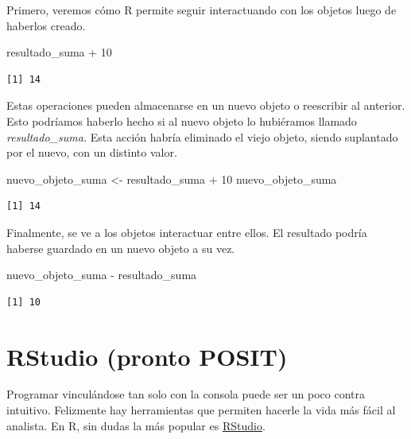 \documentclass[
  letterpaper,
  DIV=11,
  numbers=noendperiod]{scrreprt}
\newenvironment{Shaded}{\begin{snugshade}}{\end{snugshade}}
\newcommand{\DecValTok}[1]{\textcolor[rgb]{0.68,0.00,0.00}{#1}}
\newcommand{\NormalTok}[1]{\textcolor[rgb]{0.00,0.23,0.31}{#1}}
\newcommand{\OtherTok}[1]{\textcolor[rgb]{0.00,0.23,0.31}{#1}}
\newcommand{\SpecialCharTok}[1]{\textcolor[rgb]{0.37,0.37,0.37}{#1}}
\begin{document}
Primero, veremos cómo R permite seguir interactuando con los objetos
luego de haberlos creado.

\begin{Shaded}
\begin{Highlighting}[]
\NormalTok{resultado\_suma }\SpecialCharTok{+} \DecValTok{10}
\end{Highlighting}
\end{Shaded}

\begin{verbatim}
[1] 14
\end{verbatim}

Estas operaciones pueden almacenarse en un nuevo objeto o reescribir al
anterior. Esto podríamos haberlo hecho si al nuevo objeto lo hubiéramos
llamado \emph{resultado\_suma.} Esta acción habría eliminado el viejo
objeto, siendo suplantado por el nuevo, con un distinto valor.

\begin{Shaded}
\begin{Highlighting}[]
\NormalTok{nuevo\_objeto\_suma }\OtherTok{\textless{}{-}}\NormalTok{ resultado\_suma }\SpecialCharTok{+} \DecValTok{10}
\NormalTok{nuevo\_objeto\_suma}
\end{Highlighting}
\end{Shaded}

\begin{verbatim}
[1] 14
\end{verbatim}

Finalmente, se ve a los objetos interactuar entre ellos. El resultado
podría haberse guardado en un nuevo objeto a su vez.

\begin{Shaded}
\begin{Highlighting}[]
\NormalTok{nuevo\_objeto\_suma }\SpecialCharTok{{-}}\NormalTok{ resultado\_suma}
\end{Highlighting}
\end{Shaded}

\begin{verbatim}
[1] 10
\end{verbatim}

\hypertarget{rstudio-pronto-posit}{%
\section{RStudio (pronto POSIT)}\label{rstudio-pronto-posit}}

Programar vinculándose tan solo con la consola puede ser un poco contra
intuitivo. Felizmente hay herramientas que permiten hacerle la vida más
fácil al analista. En R, sin dudas la más popular es
\href{https://www.rstudio.com/}{RStudio}.
\end{document}

